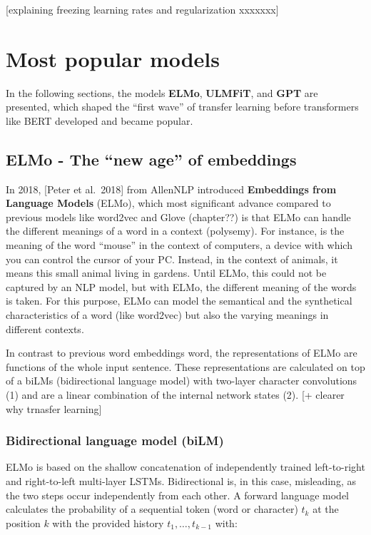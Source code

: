 \documentclass[]{krantz}
\begin{document}
{[}explaining freezing learning rates and regularization xxxxxxx{]}

\hypertarget{most-popular-models}{%
\section{Most popular models}\label{most-popular-models}}

In the following sections, the models \textbf{ELMo}, \textbf{ULMFiT}, and \textbf{GPT} are presented, which shaped the ``first wave'' of transfer learning before transformers like BERT developed and became popular.

\hypertarget{elmo---the-new-age-of-embeddings}{%
\subsection{ELMo - The ``new age'' of embeddings}\label{elmo---the-new-age-of-embeddings}}

In 2018, {[}Peter et al.~2018{]} from AllenNLP introduced \textbf{Embeddings from Language Models} (ELMo), which most significant advance compared to previous models like word2vec and Glove (chapter??) is that ELMo can handle the different meanings of a word in a context (polysemy). For instance, is the meaning of the word ``mouse'' in the context of computers, a device with which you can control the cursor of your PC. Instead, in the context of animals, it means this small animal living in gardens. Until ELMo, this could not be captured by an NLP model, but with ELMo, the different meaning of the words is taken. For this purpose, ELMo can model the semantical and the synthetical characteristics of a word (like word2vec) but also the varying meanings in different contexts.

In contrast to previous word embeddings word, the representations of ELMo are functions of the whole input sentence. These representations are calculated on top of a biLMs (bidirectional language model) with two-layer character convolutions (1) and are a linear combination of the internal network states (2). {[}+ clearer why trnasfer learning{]}

\hypertarget{bidirectional-language-model-bilm}{%
\subsubsection{Bidirectional language model (biLM)}\label{bidirectional-language-model-bilm}}

ELMo is based on the shallow concatenation of independently trained left-to-right and right-to-left multi-layer LSTMs. Bidirectional is, in this case, misleading, as the two steps occur independently from each other.
A forward language model calculates the probability of a sequential token (word or character) \(t_{k}\) at the position \(k\) with the provided history \(t_{1}, \ldots, t_{k-1}\) with:
\end{document}

